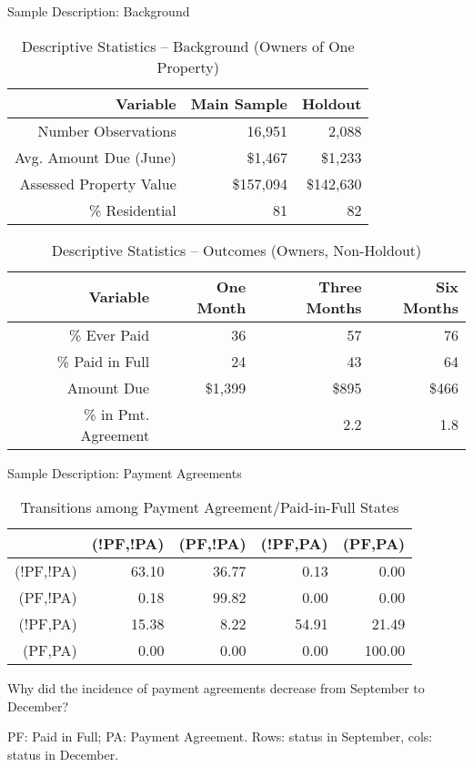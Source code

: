 \documentclass[ignorenonframetext,]{beamer}
\begin{document}
\begin{frame}{Sample Description: Background}

\begin{table}[ht]
\centering
\caption{Descriptive Statistics -- Background (Owners of One Property)} 
\label{table:descriptivesI}
\begin{tabular}{|r|r|r|}
   \hline
Variable & Main Sample & Holdout \\ 
   \hline
Number Observations & 16,951 & 2,088 \\ 
  Avg. Amount Due (June) & \$1,467 & \$1,233 \\ 
  Assessed Property Value & \$157,094 & \$142,630 \\ 
  \% Residential & 81 & 82 \\ 
   \hline
\end{tabular}
\end{table}\begin{table}[ht]
\centering
\caption{Descriptive Statistics -- Outcomes (Owners, Non-Holdout)} 
\label{table:descriptivesII}
\begin{tabular}{|r|r|r|r|}
  \hline
Variable & One Month & Three Months & Six Months \\ 
  \hline
\% Ever Paid & 36 & 57 & 76 \\ 
  \% Paid in Full & 24 & 43 & 64 \\ 
  Amount Due & \$1,399 & \$895 & \$466 \\ 
  \% in Pmt. Agreement &  & 2.2 & 1.8 \\ 
   \hline
\end{tabular}
\end{table}

\end{frame}

\begin{frame}{Sample Description: Payment Agreements}

\begin{table}[ht]
\centering
\caption{Transitions among Payment Agreement/Paid-in-Full States} 
\label{table:pa_trans}
\begin{tabular}{rrrrr}
  \hline
 & (!PF,!PA) & (PF,!PA) & (!PF,PA) & (PF,PA) \\ 
  \hline
(!PF,!PA) & 63.10 & 36.77 & 0.13 & 0.00 \\ 
  (PF,!PA) & 0.18 & 99.82 & 0.00 & 0.00 \\ 
  (!PF,PA) & 15.38 & 8.22 & 54.91 & 21.49 \\ 
  (PF,PA) & 0.00 & 0.00 & 0.00 & 100.00 \\ 
   \hline
\end{tabular}
\end{table}

Why did the incidence of payment agreements decrease from September to
December?

PF: Paid in Full; PA: Payment Agreement. Rows: status in September,
cols: status in December.

\end{frame}
\end{document}
